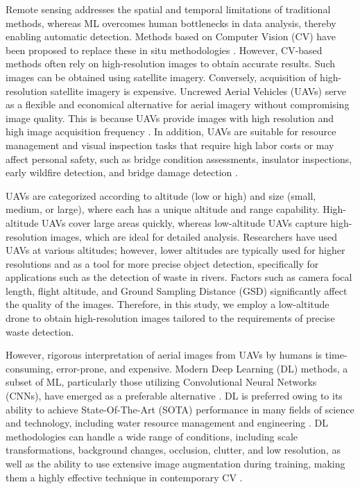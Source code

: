 \documentclass{ieeeaccess}
\begin{document}
Remote sensing addresses the spatial and temporal limitations of traditional methods, whereas ML overcomes human bottlenecks in data analysis, thereby enabling automatic detection. Methods based on Computer Vision (CV) have been proposed to replace these in situ methodologies \cite{kylili2020intelligent, van2020automated}. However, CV-based methods often rely on high-resolution images to obtain accurate results. Such images can be obtained using satellite imagery. Conversely, acquisition of high-resolution satellite imagery is expensive. Uncrewed Aerial Vehicles (UAVs) serve as a flexible and economical alternative for aerial imagery without compromising image quality. This is because UAVs provide images with high resolution and high image acquisition frequency \cite{Yao2017EstimationOW}. In addition, UAVs are suitable for resource management and visual inspection tasks that require high labor costs or may affect personal safety, such as bridge condition assessments, insulator inspections, early wildfire detection, and bridge damage detection \cite{cheng2024methods}.

UAVs are categorized according to altitude (low or high) and size (small, medium, or large), where each has a unique altitude and range capability. High-altitude UAVs cover large areas quickly, whereas low-altitude UAVs capture high-resolution images, which are ideal for detailed analysis. Researchers have used UAVs at various altitudes; however, lower altitudes are typically used for higher resolutions and as a tool for more precise object detection, specifically for applications such as the detection of waste in rivers. Factors such as camera focal length, flight altitude, and Ground Sampling Distance (GSD) significantly affect the quality of the images. Therefore, in this study, we employ a low-altitude drone to obtain high-resolution images tailored to the requirements of precise waste detection.

However, rigorous interpretation of aerial images from UAVs by humans is time-consuming, error-prone, and expensive. Modern Deep Learning (DL) methods, a subset of ML, particularly those utilizing Convolutional Neural Networks (CNNs), have emerged as a preferable alternative \cite{isprs-archives-XLII-2-419-2018}. DL is preferred owing to its ability to achieve State-Of-The-Art (SOTA) performance in many fields of science and technology, including water resource management and engineering \cite{sit2020comprehensive}. DL methodologies can handle a wide range of conditions, including scale transformations, background changes, occlusion, clutter, and low resolution, as well as the ability to use extensive image augmentation during training, making them a highly effective technique in contemporary CV \cite{zhao2019object}.
 
\end{document}
